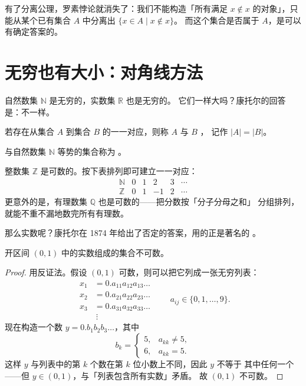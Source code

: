 \begin{example}
有了分离公理，罗素悖论就消失了：我们不能构造「所有满足 $x\notin x$
的对象」，只能从某个已有集合 $A$ 中分离出 $\{x\in A\mid x\notin x\}$。
而这个集合是否属于 $A$，是可以有确定答案的。
\end{example}

\section{无穷也有大小：对角线方法}

自然数集 $\mathbb{N}$ 是无穷的，实数集 $\mathbb{R}$ 也是无穷的。
它们一样大吗？康托尔的回答是：不一样。

\begin{definition}[等势]
若存在从集合 $A$ 到集合 $B$ 的一一对应，则称 $A$ 与 $B$ ，
记作 $|A|=|B|$。
\end{definition}

\begin{definition}[可数集]
与自然数集 $\mathbb{N}$ 等势的集合称为 。
\end{definition}

\begin{example}
整数集 $\mathbb{Z}$ 是可数的。按下表排列即可建立一一对应：
\[
  \begin{array}{c|ccccc}
  \mathbb{N} & 0 & 1 & 2 & 3 & \cdots\\ \hline
  \mathbb{Z} & 0 & 1 & -1 & 2 & \cdots
  \end{array}
\]
更意外的是，有理数集 $\mathbb{Q}$ 也是可数的——把分数按「分子分母之和」
分组排列，就能不重不漏地数完所有有理数。
\end{example}

那么实数呢？康托尔在 1874 年给出了否定的答案，用的正是著名的
。

\begin{theorem}[康托尔]
开区间 $(0,1)$ 中的实数组成的集合不可数。
\end{theorem}

\begin{proof}
用反证法。假设 $(0,1)$ 可数，则可以把它列成一张无穷列表：
\[
  \begin{aligned}
  x_1&=0.a_{11}a_{12}a_{13}\ldots\\
  x_2&=0.a_{21}a_{22}a_{23}\ldots\\
  x_3&=0.a_{31}a_{32}a_{33}\ldots\\
  &\ \vdots
  \end{aligned}
  \qquad a_{ij}\in\{0,1,\dots,9\}.
\]
现在构造一个数 $y=0.b_1b_2b_3\ldots$，其中
\[
  b_k=
  \begin{cases}
    5, & a_{kk}\neq 5,\\
    6, & a_{kk}=5.
  \end{cases}
\]
这样 $y$ 与列表中的第 $k$ 个数在第 $k$ 位小数上不同，因此 $y$ 不等于
其中任何一个——但 $y\in(0,1)$，与「列表包含所有实数」矛盾。
故 $(0,1)$ 不可数。
\end{proof}

